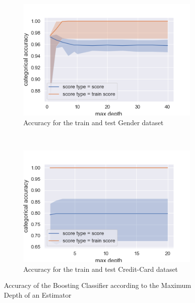 \documentclass[10pt]{article}
\begin{document}
		\paragraph*{}
			\begin{figure}[h]
				\centering
				\begin{subfigure}[]{0.45\columnwidth}
					\centering
					\includegraphics[width=\linewidth]{../graphics/boost_gender_max_depth_score_type_score_type.png}
					\caption{Accuracy for the train and test Gender dataset}
					\label{boost:g_train_vs_test}
				\end{subfigure}
				~
				\begin{subfigure}[]{0.45\columnwidth}
					\centering
					\includegraphics[width=\linewidth]{../graphics/boost_creditcard_max_depth_score_type_score_type.png}
					\caption{Accuracy for the train and test Credit-Card dataset}
					\label{boost:cc_train_vs_test}
				\end{subfigure}
				\caption{Accuracy of the Boosting Classifier according to the Maximum Depth of an Estimator}
				\label{boost:train_vs_test}
			\end{figure}
\end{document}
